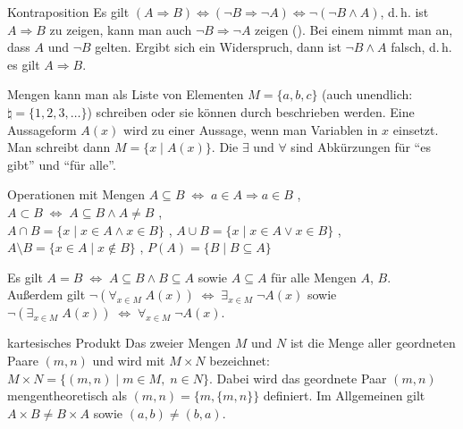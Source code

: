 \begin{Def}{Kontraposition}
    Es gilt $(A \Rightarrow B) \Leftrightarrow (\lnot B \Rightarrow \lnot A)
    \Leftrightarrow \lnot(\lnot B \land A)$, d.\,h. ist $A \Rightarrow B$ zu
    zeigen, kann man auch $\lnot B \Rightarrow \lnot A$ zeigen
    ().
    Bei einem  nimmt man an, dass $A$ und
    $\lnot B$ gelten.
    Ergibt sich ein Widerspruch, dann ist $\lnot B \land A$ falsch, d.\,h.
    es gilt $A \Rightarrow B$.
\end{Def}

\begin{Notation}
    Mengen kann man als Liste von Elementen $M = \{a, b, c\}$
    (auch unendlich: $\natural = \{1, 2, 3, \ldots\}$) schreiben oder sie
    können durch  beschrieben werden.
    Eine Aussageform $A(x)$ wird zu einer Aussage, wenn man Variablen in $x$
    einsetzt.
    Man schreibt dann $M = \{x \;|\; A(x)\}$.
    Die  $\exists$ und $\forall$ sind Abkürzungen für
    "`es gibt"' und "`für alle"'.
\end{Notation}

\begin{Def}{Operationen mit Mengen}
    $A \subseteq B \;\Leftrightarrow\; a \in A \Rightarrow a \in B$
    , \\
    $A \subset B \;\Leftrightarrow\; A \subseteq B \land A \not= B$
    , \\
    $A \cap B = \{x \;|\; x \in A \land x \in B\}$ ,
    $A \cup B = \{x \;|\; x \in A \lor x \in B\}$ ,
    $A \setminus B = \{x \in A \;|\; x \notin B\}$ ,
    $P(A) = \{B \;|\; B \subseteq A\}$ 
\end{Def}

\begin{Bem}
    Es gilt $A = B \;\Leftrightarrow\; A \subseteq B \land B \subseteq A$
    sowie $A \subseteq A$ für alle Mengen $A$, $B$. \\
    Außerdem gilt $\lnot(\forall_{x \in M}\; A(x)) \;\Leftrightarrow\;
    \exists_{x \in M}\; \lnot A(x)$ sowie
    $\lnot(\exists_{x \in M}\; A(x)) \;\Leftrightarrow\;
    \forall_{x \in M}\; \lnot A(x)$.
\end{Bem}

\begin{Def}{kartesisches Produkt}
    Das  zweier Mengen $M$ und $N$ ist die Menge
    aller geordneten Paare $(m, n)$ und wird mit $M \times N$ bezeichnet: \\
    $M \times N = \{(m, n) \;|\; m \in M,\; n \in N\}$.
    Dabei wird das geordnete Paar $(m, n)$ mengentheoretisch als
    $(m, n) = \{m, \{m, n\}\}$ definiert.
    Im Allgemeinen gilt $A \times B \not= B \times A$
    sowie $(a, b) \not= (b, a)$.
\end{Def}

